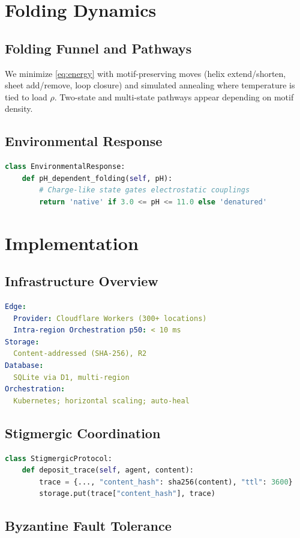 \documentclass[11pt]{article}
\begin{document}
\section{Folding Dynamics}
\subsection{Folding Funnel and Pathways}
We minimize \cref{eq:energy} with motif-preserving moves (helix extend/shorten, sheet add/remove, loop closure) and simulated annealing where temperature is tied to load $\rho$. Two-state and multi-state pathways appear depending on motif density.
\subsection{Environmental Response}
\begin{lstlisting}[style=code,language=Python]
class EnvironmentalResponse:
    def pH_dependent_folding(self, pH):
        # Charge-like state gates electrostatic couplings
        return 'native' if 3.0 <= pH <= 11.0 else 'denatured'
\end{lstlisting}
\section{Implementation}
\subsection{Infrastructure Overview}
\begin{lstlisting}[style=code,language=Yaml]
Edge:
  Provider: Cloudflare Workers (300+ locations)
  Intra-region Orchestration p50: < 10 ms
Storage:
  Content-addressed (SHA-256), R2
Database:
  SQLite via D1, multi-region
Orchestration:
  Kubernetes; horizontal scaling; auto-heal
\end{lstlisting}
\subsection{Stigmergic Coordination}
\begin{lstlisting}[style=code,language=Python]
class StigmergicProtocol:
    def deposit_trace(self, agent, content):
        trace = {..., "content_hash": sha256(content), "ttl": 3600}
        storage.put(trace["content_hash"], trace)
\end{lstlisting}
\subsection{Byzantine Fault Tolerance}
\end{document}
